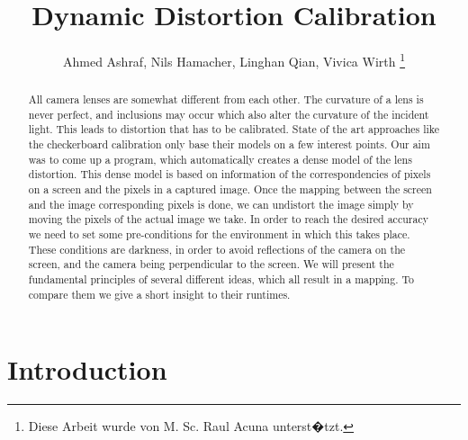 \documentclass[journal,final,a4paper,twoside]{PS}
\begin{document}
\newcommand{\euertitel}{Dynamic Distortion Calibration}   %
\newcommand{\betreuer}{M. Sc. Raul Acuna }  %

\headsep 40pt
\title{\euertitel}
\author{Ahmed Ashraf,
        Nils Hamacher,
        Linghan Qian,
	Vivica Wirth
\thanks{Diese Arbeit wurde von \betreuer unterst�tzt.}}

\maketitle



\begin{abstract}

All camera lenses are somewhat different from each other. The curvature of a lens is never perfect, and inclusions may occur which also alter the curvature of the incident light. This leads to distortion that has to be calibrated. State of the art approaches like the checkerboard calibration only base their models on a few interest points. Our aim was to come up a program, which automatically creates a dense model of the lens distortion. This dense model is based on information of the correspondencies of pixels on a screen and the pixels in a captured image. Once the mapping between the screen and the image corresponding pixels is done, we can undistort the image simply by moving the pixels of the actual image we take. In order to reach the desired accuracy we need to set some pre-conditions for the environment in which this takes place. These conditions are darkness, in order to avoid reflections of the camera on the screen, and the camera being perpendicular to the screen. We will present the fundamental principles of several different ideas, which all result in a mapping. To compare them we give a short insight to their runtimes.
\end{abstract}

\section{Introduction}
\end{document}
